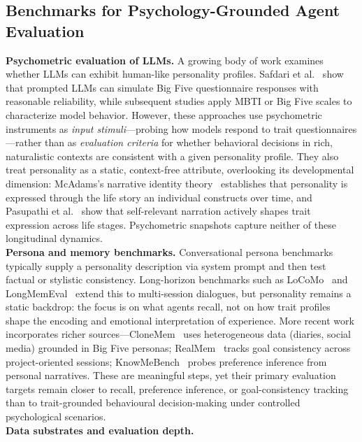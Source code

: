 \documentclass{article}
\begin{document}
\subsection{Benchmarks for Psychology-Grounded Agent Evaluation}
\textbf{Psychometric evaluation of LLMs.}
A growing body of work examines whether LLMs can exhibit human-like personality profiles. Safdari et al.~\cite{serapio2023personality} show that prompted LLMs can simulate Big Five questionnaire responses with reasonable reliability, while subsequent studies apply MBTI or Big Five scales to characterize model behavior. However, these approaches use psychometric instruments as \emph{input stimuli}—probing how models respond to trait questionnaires—rather than as \emph{evaluation criteria} for whether behavioral decisions in rich, naturalistic contexts are consistent with a given personality profile. They also treat personality as a static, context-free attribute, overlooking its developmental dimension: McAdams's narrative identity theory~\cite{mcadams2001psychology} establishes that personality is expressed through the life story an individual constructs over time, and Pasupathi et al.~\cite{pasupathi2007developing} show that self-relevant narration actively shapes trait expression across life stages. Psychometric snapshots capture neither of these longitudinal dynamics.\\
\textbf{Persona and memory benchmarks.}
Conversational persona benchmarks typically supply a personality description via system prompt and then test factual or stylistic consistency. Long-horizon benchmarks such as LoCoMo~\cite{maharana2024evaluating} and LongMemEval~\cite{wu2024longmemeval} extend this to multi-session dialogues, but personality remains a static backdrop: the focus is on what agents recall, not on how trait profiles shape the encoding and emotional interpretation of experience. More recent work incorporates richer sources—CloneMem~\cite{hu2026clonemem} uses heterogeneous data (diaries, social media) grounded in Big Five personas; RealMem~\cite{bian2026realmem} tracks goal consistency across project-oriented sessions; KnowMeBench~\cite{wu2026knowme} probes preference inference from personal narratives. These are meaningful steps, yet their primary evaluation targets remain closer to recall, preference inference, or goal-consistency tracking than to trait-grounded behavioural decision-making under controlled psychological scenarios.\\
\textbf{Data substrates and evaluation depth.}
\end{document}
